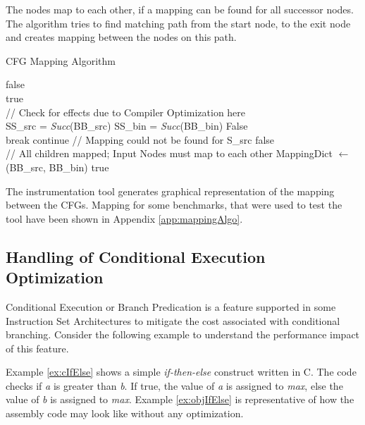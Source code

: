 The nodes map to each other, if a mapping can be found for all successor nodes. The algorithm tries to find matching path from the start node, to the exit node and creates mapping between the nodes on this path.

\begin{algorithm}[h!]
\caption{CFG Mapping Algorithm}\label{algo:mapping}
\begin{algorithmic}[1]
\State \Return false
\EndIf
\\
\State \Return true
\EndIf
\\
\State // Check for effects due to Compiler Optimization here
\\
\State SS\_src = \textit{Succ}(BB\_src)
\State SS\_bin = \textit{Succ}(BB\_bin)
\State \Return False
\EndIf
\\
\State break
\Else
\State continue
\EndIf
\EndFor
\State // Mapping could not be found for S\_src
\State \Return false
\EndFor
\\
\State // All children mapped; Input Nodes must map to each other
\State MappingDict $\leftarrow$ (BB\_src, BB\_bin)
\State \Return true
\\
\EndFunction
\end{algorithmic}
\end{algorithm}

The instrumentation tool generates graphical representation of the mapping between the CFGs. Mapping for some benchmarks, that were used to test the tool have been shown in Appendix \ref{app:mappingAlgo}.

\subsection{Handling of Conditional Execution Optimization}
\label{subsec:CondExec}
Conditional Execution or Branch Predication is a feature supported in some Instruction Set Architectures to mitigate the cost associated with conditional branching. Consider the following example to understand the performance impact of this feature.

Example \ref{ex:cIfElse} shows a simple \emph{if-then-else} construct written in C. The code checks if \emph{a} is greater than \emph{b}. If true, the value of \emph{a} is assigned to \emph{max}, else the value of \emph{b} is assigned to \emph{max}. Example \ref{ex:objIfElse} is representative of how the assembly code may look like without any optimization.

